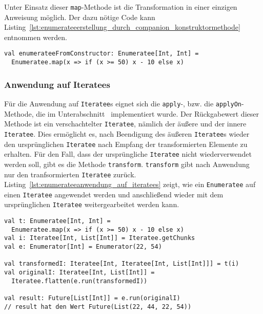 Unter Einsatz dieser \lstinline|map|-Methode ist die Transformation in einer einzigen Anweisung möglich.
Der dazu nötige Code kann Listing~\ref{lst:enumerateeerstellung_durch_companion_konstruktormethode} entnommen werden.

\begin{lstlisting}[caption=Erstellung eines Enumeratees durch die map-Konstruktormethode, label=lst:enumerateeerstellung_durch_companion_konstruktormethode]
val enumerateeFromConstructor: Enumeratee[Int, Int] =
  Enumeratee.map(x => if (x >= 50) x - 10 else x)
\end{lstlisting}



\subsubsection{Anwendung auf Iteratees} %
\label{ssub:enumerateeanwendung_auf_iteratees}

Für die Anwendung auf \lstinline|Iteratee|s eignet sich die \lstinline|apply|-, bzw. die \lstinline|applyOn|-Methode, die im Unterabschnitt~ implementiert wurde.
Der Rückgabewert dieser Methode ist ein verschachtelter \lstinline|Iteratee|, nämlich der äußere und der innere \lstinline|Iteratee|.
Dies ermöglicht es, nach Beendigung des äußeren \lstinline|Iteratee|s wieder den ursprünglichen \lstinline|Iteratee| nach Empfang der transformierten Elemente zu erhalten.
Für den Fall, dass der ursprüngliche \lstinline|Iteratee| nicht wiederverwendet werden soll, gibt es die Methode \lstinline|transform|.
\lstinline|transform| gibt nach Anwendung nur den tranfsormierten \lstinline|Iteratee| zurück.
Listing~\ref{lst:enumerateeanwendung_auf_iteratees} zeigt, wie ein \lstinline|Enumeratee| auf einen \lstinline|Iteratee| angewendet werden und anschließend wieder mit dem ursprünglichen \lstinline|Iteratee| weitergearbeitet werden kann.

\begin{lstlisting}[caption=Enumerateeanwendung auf Iteratees, label=lst:enumerateeanwendung_auf_iteratees]
val t: Enumeratee[Int, Int] =
  Enumeratee.map(x => if (x >= 50) x - 10 else x)
val i: Iteratee[Int, List[Int]] = Iteratee.getChunks
val e: Enumerator[Int] = Enumerator(22, 54)

val transformedI: Iteratee[Int, Iteratee[Int, List[Int]]] = t(i)
val originalI: Iteratee[Int, List[Int]] =
  Iteratee.flatten(e.run(transformedI))

val result: Future[List[Int]] = e.run(originalI)
// result hat den Wert Future(List(22, 44, 22, 54))
\end{lstlisting}

